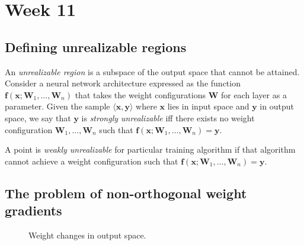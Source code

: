 \documentclass{article}
\renewcommand\vec{\mathbf}
\begin{document}
\section{Week 11}
\subsection{Defining unrealizable regions}
An \textit{unrealizable region} is a subspace of the output space that cannot be attained. 
Consider a neural network architecture expressed as the function $\vec{f}(\vec{x}; \vec{W}_1, \dots, \vec{W}_n)$ that takes the weight configurations $\vec{W}$ for each layer as a parameter.
Given the sample $\langle \vec{x}, \vec{y}\rangle$ where $\vec{x}$ lies in input space and $\vec{y}$ in output space, we say that $\vec{y}$ is \textit{strongly unrealizable} iff there exists no weight configuration $\vec{W}_1,\dots,\vec{W}_n$ such that $\vec{f}(\vec{x};\vec{W}_1,\dots,\vec{W}_n)=\vec{y}$. 

A point is \textit{weakly unrealizable} for particular training algorithm if that algorithm cannot achieve a weight configuration such that $\vec{f}(\vec{x};\vec{W}_1,\dots,\vec{W}_n)=\vec{y}$.

\subsection{The problem of non-orthogonal weight gradients}
\label{sec:week11:orthogonal}

\begin{wrapfigure}{r}{.5\textwidth}
    \centering
    \caption{Weight changes in output space.}
    \label{fig:week11:orthogonal}
\end{wrapfigure}
\end{document}

